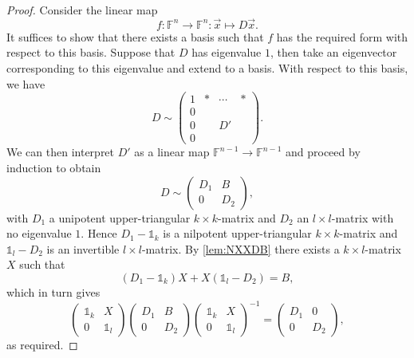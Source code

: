 \documentclass[a4paper]{article}
\theoremstyle{plain}
\theoremstyle{definition}
\theoremstyle{remark}
\newcommand{\I}{\mathds{1}}
\newcommand{\FF}{{\mathbb{F}}}
\begin{document}
\begin{proof}
	Consider the linear map \begin{equation*}
	f: \FF^n \to \FF^n: \vec{x} \mapsto D\vec{x}.
	\end{equation*}
	It suffices to show that there exists a basis such that \(f\) has the required form with respect to this basis. Suppose that \(D\) has eigenvalue \(1\), then take an eigenvector corresponding to this eigenvalue and extend to a basis. With respect to this basis, we have
	\begin{equation*}
	D \sim \left(\begin{array}{c|ccc}
	1 & * & \cdots & *\\
	\hline
	0 & & & \\
	0 & & D'&\\
	0 & & &
	\end{array}\right).
	\end{equation*}
	We can then interpret \(D'\) as a linear map \(\FF^{n-1} \to \FF^{n-1}\) and proceed by induction to obtain
	\begin{equation*}
		D \sim \left(\begin{array}{c|c}
		D_1 & B\\
		\hline
		0 & D_2
		\end{array}\right),
	\end{equation*}
	with \(D_1\) a unipotent upper-triangular \(k \times k\)-matrix and \(D_2\) an \(l \times l\)-matrix with no eigenvalue \(1\).  Hence \(D_1-\I_k\) is a nilpotent upper-triangular \(k \times k\)-matrix and \(\I_l - D_2\) is an invertible \(l \times l\)-matrix. By \cref{lem:NXXDB} there exists a \(k \times l\)-matrix \(X\) such that
	\begin{equation*}
	(D_1 - \I_k) X + X(\I_l-D_2) = B,
	\end{equation*}
	which in turn gives
	\begin{equation*}
	\begin{pmatrix}
	\I_k & X\\
	0 & \I_l
	\end{pmatrix}\begin{pmatrix}
	D_1 & B\\
	0 & D_2
	\end{pmatrix}\begin{pmatrix}
	\I_k & X\\
	0 & \I_l
	\end{pmatrix}^{-1}
	= \begin{pmatrix}
	D_1 & 0\\
	0 & D_2
	\end{pmatrix},
	\end{equation*}
	as required.
\end{proof}
\end{document}
